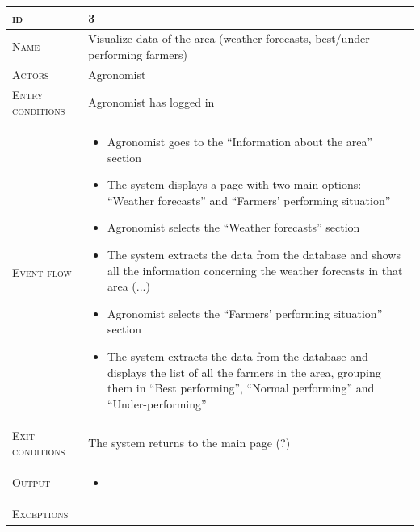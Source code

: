 \begin{table}[H]
    \centering
    \begin{tabular}[c]{|l|p{}|}
        \hline %
    	\textsc{id}                 &   3\\
    	\hline %
    	\textsc{Name}               &   Visualize data of the area (weather forecasts, best/under performing farmers)\\
    	\hline %
    	\textsc{Actors}             &   Agronomist\\
    	\hline %
    	\textsc{Entry conditions}   &   Agronomist has logged in\\
    	\hline %
    	\textsc{Event flow}         &   \footnotesize
            	                        \begin{itemize}
                                    	    \item Agronomist goes to the “Information about the area” section
                                    		\item The system displays a page with two main options: “Weather forecasts” and “Farmers’ performing situation”
                                    		\item Agronomist selects  the “Weather forecasts” section
                                    		\item The system extracts the data from the database and shows all the information concerning the weather forecasts in that area (...)
                                    		\item Agronomist selects the “Farmers’ performing situation” section
                                    		\item The system extracts the data from the database and displays the list of all the farmers in the area, grouping them in “Best performing”, “Normal performing” and “Under-performing”
                                        \end{itemize}\\
        \hline %
        \textsc{Exit conditions}    &  The system returns to the main page (?)\\
    	\hline %
    	\textsc{Output}             &  \begin{itemize}
    	    \item %
    	\end{itemize}\\
    	\hline %
    	\textsc{Exceptions}         &  %
    	\\
    	\hline %
        

\end{tabular}
\end{table}
